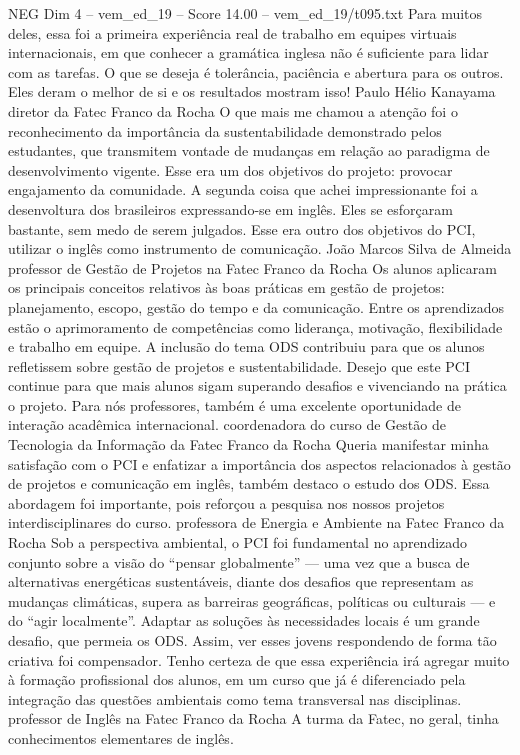 \begin{textsample}{NEG Dim 4 – vem\_ed\_19 – Score 14.00 – vem\_ed\_19/t095.txt}
Para muitos deles, essa foi a primeira experiência real de trabalho em equipes virtuais internacionais, em que conhecer a gramática inglesa não é suficiente para lidar com as tarefas.
O que se deseja é tolerância, paciência e abertura para os outros.
Eles deram o melhor de si e os resultados mostram isso!
Paulo Hélio Kanayama diretor da Fatec Franco da Rocha O que mais me chamou a atenção foi o reconhecimento da importância da sustentabilidade demonstrado pelos estudantes, que transmitem vontade de mudanças em relação ao paradigma de desenvolvimento vigente.
Esse era um dos objetivos do projeto: provocar engajamento da comunidade.
A segunda coisa que achei impressionante foi a desenvoltura dos brasileiros expressando-se em inglês.
Eles se esforçaram bastante, sem medo de serem julgados.
Esse era outro dos objetivos do PCI, utilizar o inglês como instrumento de comunicação.
João Marcos Silva de Almeida professor de Gestão de Projetos na Fatec Franco da Rocha Os alunos aplicaram os principais conceitos relativos às boas práticas em gestão de projetos: planejamento, escopo, gestão do tempo e da comunicação.
Entre os aprendizados estão o aprimoramento de competências como liderança, motivação, flexibilidade e trabalho em equipe.
A inclusão do tema ODS contribuiu para que os alunos refletissem sobre gestão de projetos e sustentabilidade.
Desejo que este PCI continue para que mais alunos sigam superando desafios e vivenciando na prática o projeto.
Para nós professores, também é uma excelente oportunidade de interação acadêmica internacional. coordenadora do curso de Gestão de Tecnologia da Informação da Fatec Franco da Rocha Queria manifestar minha satisfação com o PCI e enfatizar a importância dos aspectos relacionados à gestão de projetos e comunicação em inglês, também destaco o estudo dos ODS.
Essa abordagem foi importante, pois reforçou a pesquisa nos nossos projetos interdisciplinares do curso. professora de Energia e Ambiente na Fatec Franco da Rocha Sob a perspectiva ambiental, o PCI foi fundamental no aprendizado conjunto sobre a visão do “pensar globalmente” — uma vez que a busca de alternativas energéticas sustentáveis, diante dos desafios que representam as mudanças climáticas, supera as barreiras geográficas, políticas ou culturais — e do “agir localmente”.
Adaptar as soluções às necessidades locais é um grande desafio, que permeia os ODS.
Assim, ver esses jovens respondendo de forma tão criativa foi compensador.
Tenho certeza de que essa experiência irá agregar muito à formação profissional dos alunos, em um curso que já é diferenciado pela integração das questões ambientais como tema transversal nas disciplinas. professor de Inglês na Fatec Franco da Rocha A turma da Fatec, no geral, tinha conhecimentos elementares de inglês.

\end{textsample}
